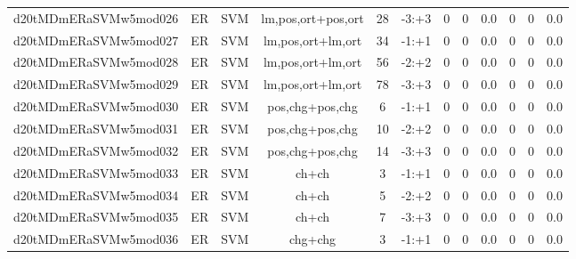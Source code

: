 \documentclass[a4paper]{article}
\begin{document}
\begin{landscape}
\begin{center}
\begin{tabular}{ |c|c|c|c|c|c|c|c|c|c|c|c|}
 
 	
 	\small{ d20tMDmERaSVMw5mod026 } & ER & SVM & lm,pos,ort+pos,ort  &  28 &  -3:+3  &  0 & 0 & 0.0  &  0 & 0 & 0.0 \\
 	

 
 	
 	\small{ d20tMDmERaSVMw5mod027 } & ER & SVM & lm,pos,ort+lm,ort  &  34 &  -1:+1  &  0 & 0 & 0.0  &  0 & 0 & 0.0 \\
 	

 
 	
 	\small{ d20tMDmERaSVMw5mod028 } & ER & SVM & lm,pos,ort+lm,ort  &  56 &  -2:+2  &  0 & 0 & 0.0  &  0 & 0 & 0.0 \\
 	

 
 	
 	\small{ d20tMDmERaSVMw5mod029 } & ER & SVM & lm,pos,ort+lm,ort  &  78 &  -3:+3  &  0 & 0 & 0.0  &  0 & 0 & 0.0 \\
 	

 
 	
 	\small{ d20tMDmERaSVMw5mod030 } & ER & SVM & pos,chg+pos,chg  &  6 &  -1:+1  &  0 & 0 & 0.0  &  0 & 0 & 0.0 \\
 	

 
 	
 	\small{ d20tMDmERaSVMw5mod031 } & ER & SVM & pos,chg+pos,chg  &  10 &  -2:+2  &  0 & 0 & 0.0  &  0 & 0 & 0.0 \\
 	

 
 	
 	\small{ d20tMDmERaSVMw5mod032 } & ER & SVM & pos,chg+pos,chg  &  14 &  -3:+3  &  0 & 0 & 0.0  &  0 & 0 & 0.0 \\
 	

 
 	
 	\small{ d20tMDmERaSVMw5mod033 } & ER & SVM & ch+ch  &  3 &  -1:+1  &  0 & 0 & 0.0  &  0 & 0 & 0.0 \\
 	

 
 	
 	\small{ d20tMDmERaSVMw5mod034 } & ER & SVM & ch+ch  &  5 &  -2:+2  &  0 & 0 & 0.0  &  0 & 0 & 0.0 \\
 	

 
 	
 	\small{ d20tMDmERaSVMw5mod035 } & ER & SVM & ch+ch  &  7 &  -3:+3  &  0 & 0 & 0.0  &  0 & 0 & 0.0 \\
 	

 
 	
 	\small{ d20tMDmERaSVMw5mod036 } & ER & SVM & chg+chg  &  3 &  -1:+1  &  0 & 0 & 0.0  &  0 & 0 & 0.0 \\
 	


\end{tabular}
\end{center}
\end{landscape}
\end{document}
